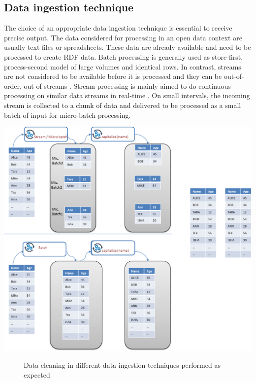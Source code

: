 \subsection{Data ingestion technique}
The choice of an appropriate data ingestion technique is essential to receive precise output. The data considered for processing in an open data context are usually text files or spreadsheets. These data are already available and need to be processed to create RDF data. Batch processing is generally used as store-first, process-second model of large volumes and identical rows. In contrast, streams are not considered to be available before it is processed and they can be out-of-order, out-of-streams \cite{beyondbatchprocessing} \cite{Sims-387}. Stream processing is mainly aimed to do continuous processing on similar data streams in real-time \cite{8reqofrealtime}. On small intervals, the incoming stream is collected to a chunk of data and delivered to be processed as a small batch of input \cite{beyondbatchprocessing} for micro-batch processing.
\begin{center}
	\includegraphics[width=38em]{./Figures/batch-cleaning-right}
	\begin{figure}[htbp]
    \caption{Data cleaning in different data ingestion techniques performed as expected}
    \label{fig:streamcorrect}
	\end{figure}
\end{center}
